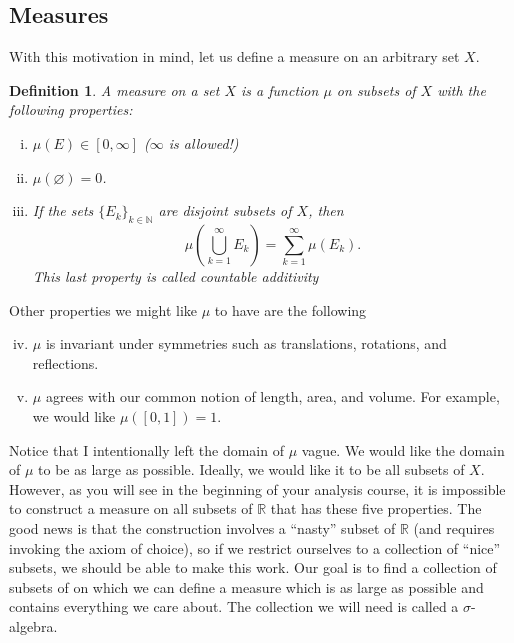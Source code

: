 \documentclass[12pt]{amsart}         %
\newtheorem{definition}{Definition}[section]
\theoremstyle{remark}
\newcommand{\N}{\mathbb{N}}
\newcommand{\R}{\mathbb{R}}
\begin{document}
\subsection{Measures}

With this motivation in mind, let us define a measure on an arbitrary set $X$.

\begin{definition}A \emph{measure} on a set $X$ is a function $\mu$ on subsets of $X$ with the following properties:
\begin{enumerate}[(i)]
\item $\mu(E) \in [0, \infty]$ ($\infty$ is allowed!)
\item $\mu(\varnothing) = 0$.
\item If the sets $\{E_k\}_{k \in \N}$ are disjoint subsets of $X$, then 
	\begin{equation*}
	\mu \left( \bigcup_{k=1}^\infty E_k \right) = \sum_{k=1}^\infty \mu(E_k).
	\end{equation*}
	This last property is called \emph{countable additivity}
\end{enumerate}
\end{definition}

Other properties we might like $\mu$ to have are the following
\begin{enumerate}[(i)]\setcounter{enumi}{3}
\item $\mu$ is invariant under symmetries such as translations, rotations, and reflections.
\item $\mu$ agrees with our common notion of length, area, and volume. For example, we would like $\mu([0,1]) = 1$.
\end{enumerate}

Notice that I intentionally left the domain of $\mu$ vague. We would like the domain of $\mu$ to be as large as possible. Ideally, we would like it to be all subsets of $X$. However, as you will see in the beginning of your analysis course, it is impossible to construct a measure on all subsets of $\R$ that has these five properties. The good news is that the construction involves a ``nasty'' subset of $\R$ (and requires invoking the axiom of choice), so if we restrict ourselves to a collection of ``nice'' subsets, we should be able to make this work. Our goal is to find a collection of subsets of on which we can define a measure which is as large as possible and contains everything we care about. The collection we will need is called a $\sigma$-algebra.
\end{document}
